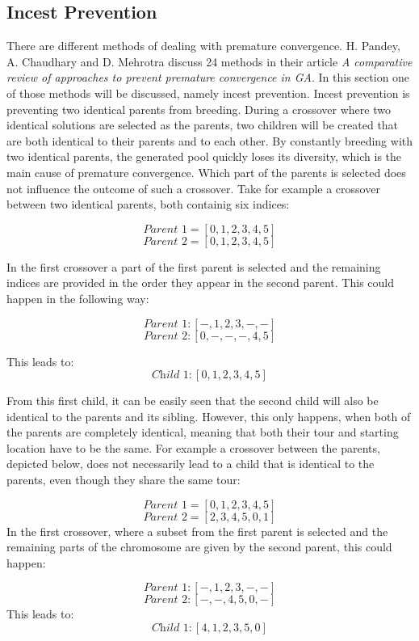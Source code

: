 \subsection{Incest Prevention} \label{incest}

\par
There are different methods of dealing with premature convergence. H. Pandey, A. Chaudhary and D. Mehrotra discuss 24 methods in their article \textit{A comparative review of approaches to prevent premature convergence in GA}\cite{Premconvergence}. In this section one of those methods will be discussed, namely incest prevention. Incest prevention is preventing two identical parents from breeding. During a crossover where two identical solutions are selected as the parents, two children will be created that are both identical to their parents and to each other. By constantly breeding with two identical parents, the generated pool quickly loses its diversity, which is the main cause of premature convergence. Which part of the parents is selected does not influence the outcome of such a crossover. Take for example a crossover between two identical parents, both containig six indices:

\[\textit{Parent 1} =  [0,1,2,3,4,5]\]  
\[\textit{Parent 2} =  [0,1,2,3,4,5]\]

\noindent In the first crossover a part of the first parent is selected and the remaining indices are provided in the order they appear in the second parent. This could happen in the following way: 

\[\textit{Parent 1}: [-,1,2,3,-,-]\]       
\[\textit{Parent 2}:[0,-,-,-,4,5]\]

\noindent This leads to: \[\textit{Child 1}: [0,1,2,3,4,5]\]
\par
From this first child, it can be easily seen that the second child will also be identical to the parents and its sibling. However, this only happens, when both of the parents are completely identical, meaning that both their tour and starting location have to be the same. For example a crossover between the parents, depicted below, does not necessarily lead to a child that is identical to the parents, even though they share the same tour:

\[\textit{Parent 1} =  [0,1,2,3,4,5]\] 
\[\textit{Parent 2} =  [2,3,4,5,0,1]\]
In the first crossover, where a subset from the first parent is selected and the remaining parts of the chromosome are given by the second parent, this could happen:

\[\textit{Parent 1}: [-,1,2,3,-,-]\]               
\[\textit{Parent 2}: [-,-,4,5,0,-]\]
This leads to: \[\textit{Child 1}: [4,1,2,3,5,0]\]

